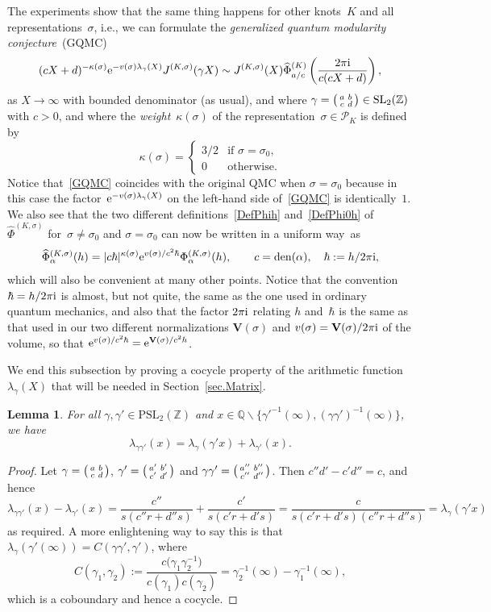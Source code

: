 \documentclass[pdftex]{sigma}
\numberwithin{equation}{section}
\newtheorem{Lemma}[Theorem]{Lemma}
\def\BZ{\mathbb Z}
\def\calP{\mathcal P}
\def\calP{\mathcal P}
\def\l{\lambda}
\def\k{\kappa}
\def\SL{\mathrm{SL}}
\def\PSL{\mathrm{PSL}}
\def\Phih{\widehat\Phi}
\def\a{\alpha}
\def\l{\lambda}
\def\Z{\mathbb Z}
\def\Q{\mathbb Q}
\def\i{^{-1}}
\def\a{\alpha}
\def\l{\lambda}
\def\s{\sigma}
\def\W{\kappa} %
\def\sma#1#2#3#4{\bigl(\smallmatrix#1&#2\\#3&#4\endsmallmatrix\bigr)} %
\def\den{\mathrm{den}}
\def\J{\mathbf J} \def\J{J} %
\def\Jt{\mathbf{\dot{\J}}}
\def\V{\mathbf V}
\def\tV{v} %
\def\be{\begin{equation}}
\def\ee{\end{equation}}
\def\ssm{\smallsetminus}
\def\g{\gamma}
\begin{document}
The experiments show that the same thing happens for other knots~$K$ and all
representations~$\s$, i.e., we can formulate the
\emph{generalized quantum modularity conjecture}~(GQMC)
\be
\label{GQMC}
(cX+d)^{-\k(\s)} {\rm e}^{-\tV(\s)  \l_\g(X)}
\J^{(K,\s)}(\g X)  \sim  \J^{(K,\s)}(X)
\Phih^{(K)}_{a/c}\left(\frac{2\pi {\rm i}}{c(cX+d)}\right) ,
\ee
as $X \to \infty$ with bounded denominator (as usual), and where
$\gamma=\sma abcd \in \SL_2(\BZ)$ with $c>0$, and
where the \emph{weight}~$\W(\s)$ of the representation~$\s\in\calP_K$
is defined by
\be
\label{Defwsigma}
\W(\s) = \begin{cases} 3/2 & \text{if $\s=\s_0$,} \\
  0 & \text{otherwise.} \end{cases}
\ee
Notice that~\eqref{GQMC} coincides with the original QMC when $\s=\s_0$ because in this
case the factor~${\rm e}^{-\tV(\s)\l_\g(X)}$ on the left-hand side of~\eqref{GQMC} is
identically~$1$. We also see that the two different definitions~\eqref{DefPhih}
and~\eqref{DefPhi0h} of $\Phih^{(K,\s)}$ for~$\s\ne\s_0$ and $\s=\s_0$ can now be
written in a uniform way~as
\be
\label{UnifPhih}
\Phih_\a^{(K,\s)}(h) =
 |c\hbar|^{\W(\s)} {\rm e}^{v(\s)/c^2\hbar} \Phi_\a^{(K,\s)}(h),
 \qquad c=\den(\a),\quad \hbar:=h/2\pi {\rm i},
\ee
which will also be convenient at many other points. Notice that the convention
$\hbar=h/2\pi {\rm i}$ is almost, but not quite, the same as the one used in ordinary
quantum mechanics, and also that the factor $2\pi {\rm i}$ relating $h$ and~$\hbar$ is
the same as that used in our two different normalizations $\V(\s)$ and
$v(\s)=\V(\s)/2\pi {\rm i}$ of the volume, so that ${\rm e}^{v(\s)/c^2\hbar}={\rm e}^{\V(\s)/c^2h}$.

We end this subsection by proving a cocycle property of the arithmetic function
$\l_\g(X)$ that will be needed in Section~\ref{sec.Matrix}.

\begin{Lemma}
\label{lem.lambda}
For all $\g, \g'\in \PSL_2(\Z)$ and
$x\in\Q\ssm\big\{{\g'}^{-1}(\infty),{(\g\g')}^{-1}(\infty)\big\}$, we have
\[%
\l_{\g \g'}(x) = \l_\g(\g' x) + \l_{\g'}(x) .
\]
\end{Lemma}

\begin{proof}
Let $\gamma=\sma abcd$, $\gamma'=\sma {a'}{b'}{c'}{d'}$ and
$\gamma \gamma'=\sma {a''}{b''}{c''}{d''}$. Then $c''d'-c'd''=c$, and hence
\[
\l_{\g \g'}(x) - \l_{\g'}(x) = \frac{c''}{s(c''r+d''s)}+\frac{c'}{s(c'r+d's)}
 = \frac c{s(c'r+d's)(c''r+d''s)} = \l_\g(\g' x)
\]
as required. A more enlightening way to say this is that $\l_\g(\g'(\infty))=C(\g\g',\g')$,
where
\[
C(\g_1,\g_2):=\frac{c\big(\g_1\g_2\i\big)}{c(\g_1)c(\g_2)}=\g_2\i(\infty)-\g_1\i(\infty),
\]
which is a coboundary and hence a cocycle.
\end{proof}
\end{document}
